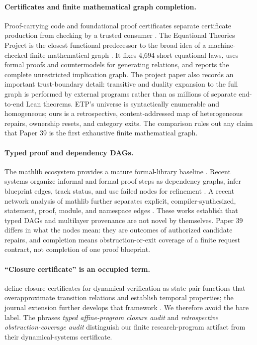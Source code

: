 \paragraph{Certificates and finite mathematical graph completion.}
Proof-carrying code and foundational proof certificates separate certificate
production from checking by a trusted consumer
\citep{Necula1997PCC,HeathMiller2015ProofCertificates}.  The Equational
Theories Project is the closest functional predecessor to the broad idea of a
machine-checked finite mathematical graph \citep{BolanEtAl2025ETP}.  It fixes
4,694 short equational laws, uses formal proofs and countermodels for generating
relations, and reports the complete unrestricted implication graph.  The
project paper also records an important trust-boundary detail: transitive and
duality expansion to the full graph is performed by external programs rather
than as millions of separate end-to-end Lean theorems.  ETP's universe is
syntactically enumerable and homogeneous; ours is a retrospective,
content-addressed map of heterogeneous repairs, ownership resets, and category
exits.  The comparison rules out any claim that Paper 39 is the first exhaustive
finite mathematical graph.

\paragraph{Typed proof and dependency DAGs.}
The mathlib ecosystem provides a mature formal-library baseline
\citep{MathlibCommunity2020}.  Recent systems organize informal and formal
proof steps as dependency graphs, infer blueprint edges, track status, and use
failed nodes for refinement
\citep{CabralEtAl2025ProofFlow,ZhuEtAl2026LeanArchitect,ChungEtAl2026GoedelArchitect}.
A recent network analysis of mathlib further separates explicit,
compiler-synthesized, statement, proof, module, and namespace edges
\citep{LiEtAl2026MathlibNetwork}.  These works establish that typed DAGs and
multilayer provenance are not novel by themselves.  Paper 39 differs in what
the nodes mean: they are outcomes of authorized candidate repairs, and
completion means obstruction-or-exit coverage of a finite request contract,
not completion of one proof blueprint.

\paragraph{“Closure certificate” is an occupied term.}
\citet{MuraliEtAl2024ClosureCertificates} define closure certificates for
dynamical verification as state-pair functions that overapproximate transition
relations and establish temporal properties; the journal extension further
develops that framework \citep{MuraliEtAl2026ClosureCertificates}.  We
therefore avoid the bare label.  The phrases \emph{typed affine-program closure
audit} and \emph{retrospective obstruction-coverage audit} distinguish our
finite research-program artifact from their dynamical-systems certificate.

